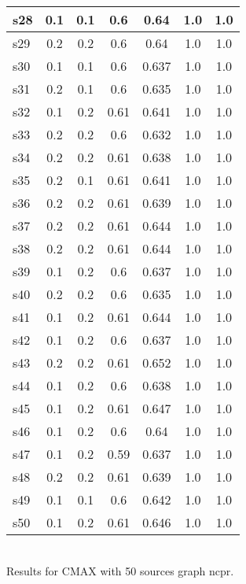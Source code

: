 \documentclass{article}
\begin{document}
\begin{tabular}{|l|c|c|c|c|c|c|}
\hline
s28 &0.1 & 0.1 & 0.6 & 0.64 & 1.0 & 1.0\\
\hline
s29 &0.2 & 0.2 & 0.6 & 0.64 & 1.0 & 1.0\\
\hline
s30 &0.1 & 0.1 & 0.6 & 0.637 & 1.0 & 1.0\\
\hline
s31 &0.2 & 0.1 & 0.6 & 0.635 & 1.0 & 1.0\\
\hline
s32 &0.1 & 0.2 & 0.61 & 0.641 & 1.0 & 1.0\\
\hline
s33 &0.2 & 0.2 & 0.6 & 0.632 & 1.0 & 1.0\\
\hline
s34 &0.2 & 0.2 & 0.61 & 0.638 & 1.0 & 1.0\\
\hline
s35 &0.2 & 0.1 & 0.61 & 0.641 & 1.0 & 1.0\\
\hline
s36 &0.2 & 0.2 & 0.61 & 0.639 & 1.0 & 1.0\\
\hline
s37 &0.2 & 0.2 & 0.61 & 0.644 & 1.0 & 1.0\\
\hline
s38 &0.2 & 0.2 & 0.61 & 0.644 & 1.0 & 1.0\\
\hline
s39 &0.1 & 0.2 & 0.6 & 0.637 & 1.0 & 1.0\\
\hline
s40 &0.2 & 0.2 & 0.6 & 0.635 & 1.0 & 1.0\\
\hline
s41 &0.1 & 0.2 & 0.61 & 0.644 & 1.0 & 1.0\\
\hline
s42 &0.1 & 0.2 & 0.6 & 0.637 & 1.0 & 1.0\\
\hline
s43 &0.2 & 0.2 & 0.61 & 0.652 & 1.0 & 1.0\\
\hline
s44 &0.1 & 0.2 & 0.6 & 0.638 & 1.0 & 1.0\\
\hline
s45 &0.1 & 0.2 & 0.61 & 0.647 & 1.0 & 1.0\\
\hline
s46 &0.1 & 0.2 & 0.6 & 0.64 & 1.0 & 1.0\\
\hline
s47 &0.1 & 0.2 & 0.59 & 0.637 & 1.0 & 1.0\\
\hline
s48 &0.2 & 0.2 & 0.61 & 0.639 & 1.0 & 1.0\\
\hline
s49 &0.1 & 0.1 & 0.6 & 0.642 & 1.0 & 1.0\\
\hline
s50 &0.1 & 0.2 & 0.61 & 0.646 & 1.0 & 1.0\\
\hline
\end{tabular}\\

\noindent Results for CMAX with 50 sources graph ncpr.
\end{document}
